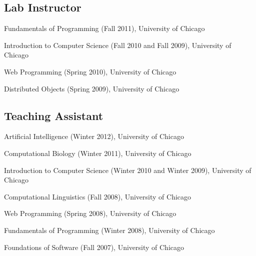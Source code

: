 \documentclass[10.5pt,letterpaper]{article}
\begin{document}
\subsection*{Lab Instructor}

\begin{itemize*}
\item Fundamentals of Programming (Fall 2011),  University of Chicago
\item Introduction to Computer Science (Fall 2010 and Fall 2009),   University of Chicago
\item Web Programming (Spring 2010),  University of Chicago
\item Distributed Objects (Spring 2009), University of Chicago
\end{itemize*}

\subsection*{Teaching Assistant}

\begin{itemize*}
\item Artificial Intelligence (Winter 2012), University of Chicago
\item Computational Biology (Winter 2011), University of Chicago
\item Introduction to Computer Science (Winter 2010 and Winter 2009), University of Chicago
\item Computational Linguistics (Fall 2008), University of Chicago
\item Web Programming (Spring 2008), University of Chicago
\item Fundamentals of Programming (Winter 2008), University of Chicago
\item Foundations of Software (Fall 2007), University of Chicago
\end{itemize*}


%
\end{document}
